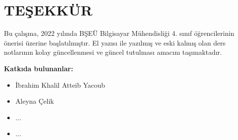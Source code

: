 \section*{TEŞEKKÜR}
Bu çalışma, 2022 yılında BŞEÜ Bilgisayar Mühendisliği 4. sınıf öğrencilerinin önerisi üzerine başlatılmıştır. El yazısı ile yazılmış ve eski kalmış olan ders notlarının kolay güncellenmesi ve güncel tutulması amacını taşımaktadır.

\textbf{Katkıda bulunanlar:}
\begin{itemize}
    \item İbrahim Khalil Atteib Yacoub
    \item Aleyna Çelik
    \item ...
    \item ...
\end{itemize}
